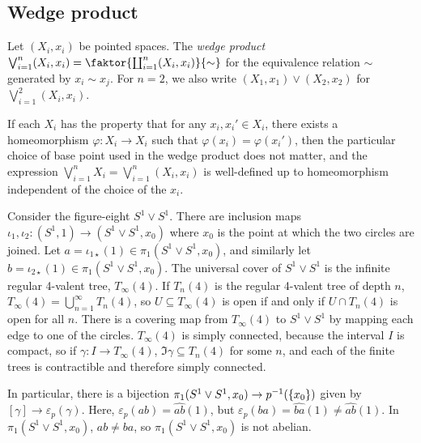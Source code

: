 \subsection{Wedge product}
\begin{definition}
	Let \( (X_i, x_i) \) be pointed spaces.
	The \emph{wedge product} \( \bigvee_{i=1}^n (X_i, x_i) = \faktor{\coprod_{i=1}^n (X_i, x_i)}{\sim} \) for the equivalence relation \( \sim \) generated by \( x_i \sim x_j \).
	For \( n = 2 \), we also write \( (X_1, x_1) \vee (X_2, x_2) \) for \( \bigvee_{i=1}^2 (X_i, x_i) \).
\end{definition}
If each \( X_i \) has the property that for any \( x_i, x_i' \in X_i \), there exists a homeomorphism \( \varphi \colon X_i \to X_i \) such that \( \varphi(x_i) = \varphi(x_i') \), then the particular choice of base point used in the wedge product does not matter, and the expression \( \bigvee_{i=1}^n X_i = \bigvee_{i=1}^n (X_i, x_i) \) is well-defined up to homeomorphism independent of the choice of the \( x_i \).
\begin{example}
	Consider the figure-eight \( S^1 \vee S^1 \).
	There are inclusion maps \( \iota_1, \iota_2 \colon (S^1,1) \to (S^1 \vee S^1, x_0) \) where \( x_0 \) is the point at which the two circles are joined.
	Let \( a = \iota_{1\star}(1) \in \pi_1(S^1 \vee S^1,x_0) \), and similarly let \( b = \iota_{2\star}(1) \in \pi_1(S^1 \vee S^1,x_0) \).
	The universal cover of \( S^1 \vee S^1 \) is the infinite regular 4-valent tree, \( T_\infty(4) \).
	If \( T_n(4) \) is the regular 4-valent tree of depth \( n \), \( T_\infty(4) = \bigcup_{n=1}^\infty T_n(4) \), so \( U \subseteq T_\infty(4) \) is open if and only if \( U \cap T_n(4) \) is open for all \( n \).
	There is a covering map from \( T_\infty(4) \) to \( S^1 \vee S^1 \) by mapping each edge to one of the circles.
	\( T_\infty(4) \) is simply connected, because the interval \( I \) is compact, so if \( \gamma \colon I \to T_\infty(4) \), \( \Im \gamma \subseteq T_n(4) \) for some \( n \), and each of the finite trees is contractible and therefore simply connected.

	In particular, there is a bijection \( \pi_1(S^1 \vee S^1, x_0) \to p^{-1}(\qty{x_0}) \) given by \( [\gamma] \to \varepsilon_p(\gamma) \).
	Here, \( \varepsilon_p(ab) = \widehat{ab}(1) \), but \( \varepsilon_p(ba) = \widehat{ba}(1) \neq \widehat{ab}(1) \).
	In \( \pi_1(S^1 \vee S^1, x_0) \), \( ab \neq ba \), so \( \pi_1(S^1 \vee S^1,x_0) \) is not abelian.
\end{example}


